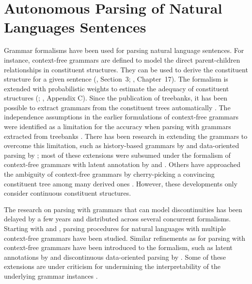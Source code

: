 \documentclass[../document.tex]{subfiles}
\begin{document}
    \section*{Autonomous Parsing of Natural Languages Sentences}
    Grammar formalisms have been used for parsing natural language sentences.
        For instance, context-free grammars are defined to model the direct parent-children relationships in constituent structures.
        They can be used to derive the constituent structure for a given sentence (\citealp{Cho56}, Section~3; \citealp{Jur23}, Chapter~17).
        The formalism is extended with probabilistic weights to estimate the adequacy of constituent structures (\citealp{Sup72}; \citealp{Jur23}, Appendix C).
    Since the publication of treebanks, it has been possible to extract grammars from the constituent trees automatically \citep{Cha96}.
    The independence assumptions in the earlier formulations of context-free grammars were identified as a limitation for the accuracy when parsing with grammars extracted from treebanks \citep[e.g.\@][Section~1.1]{collins2001convolution}.
    There has been research in extending the grammars to overcome this limitation, such as history-based grammars by \citet{Black94} and data-oriented parsing by \citet{Bod92}; most of these extensions were subsumed under the formalism of context-free grammars with latent annotation by \citet{Mat05} and \citet{Petrov06}.
    Others have approached the ambiguity of context-free grammars by cherry-picking a convincing constituent tree among many derived ones \citep{Col00}.
    However, these developments only consider continuous constituent structures.
    
    The research on parsing with grammars that can model discontinuities has been delayed by a few years and distributed across several concurrent formalisms.
    Starting with \citet{MaierSogaard08} and \citet{Kal10}, parsing procedures for natural languages with multiple context-free grammars have been studied.
    Similar refinements as for parsing with context-free grammars have been introduced to the formalism, such as latent annotations by \citet{Geb20} and discontinuous data-oriented parsing by \citet{Cra11}.
    Some of these extensions are under criticism for undermining the interpretability of the underlying grammar instances \citep[Chapter 9]{Geb20}.
\end{document}
